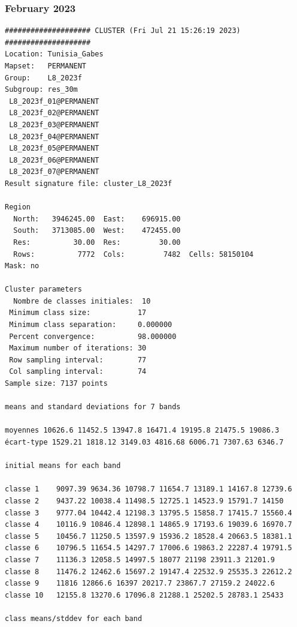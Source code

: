 \documentclass[land,article,submit,pdftex,moreauthors]{Definitions/mdpi}
\begin{document}
\subsubsection[\appendixname~\thesubsubsection]{February 2023}
\begin{scriptsize}
\begin{verbatim}
#################### CLUSTER (Fri Jul 21 15:26:19 2023) ####################
Location: Tunisia_Gabes
Mapset:   PERMANENT
Group:    L8_2023f
Subgroup: res_30m
 L8_2023f_01@PERMANENT
 L8_2023f_02@PERMANENT
 L8_2023f_03@PERMANENT
 L8_2023f_04@PERMANENT
 L8_2023f_05@PERMANENT
 L8_2023f_06@PERMANENT
 L8_2023f_07@PERMANENT
Result signature file: cluster_L8_2023f

Region
  North:   3946245.00  East:    696915.00
  South:   3713085.00  West:    472455.00
  Res:          30.00  Res:         30.00
  Rows:          7772  Cols:         7482  Cells: 58150104
Mask: no

Cluster parameters
  Nombre de classes initiales: 	10
 Minimum class size:           17
 Minimum class separation:     0.000000
 Percent convergence:          98.000000
 Maximum number of iterations: 30
 Row sampling interval:        77
 Col sampling interval:        74
Sample size: 7137 points

means and standard deviations for 7 bands

moyennes 10626.6 11452.5 13947.8 16471.4 19195.8 21475.5 19086.3
écart-type 1529.21 1818.12 3149.03 4816.68 6006.71 7307.63 6346.7

initial means for each band

classe 1    9097.39 9634.36 10798.7 11654.7 13189.1 14167.8 12739.6
classe 2    9437.22 10038.4 11498.5 12725.1 14523.9 15791.7 14150
classe 3    9777.04 10442.4 12198.3 13795.5 15858.7 17415.7 15560.4
classe 4    10116.9 10846.4 12898.1 14865.9 17193.6 19039.6 16970.7
classe 5    10456.7 11250.5 13597.9 15936.2 18528.4 20663.5 18381.1
classe 6    10796.5 11654.5 14297.7 17006.6 19863.2 22287.4 19791.5
classe 7    11136.3 12058.5 14997.5 18077 21198 23911.3 21201.9
classe 8    11476.2 12462.6 15697.2 19147.4 22532.9 25535.3 22612.2
classe 9    11816 12866.6 16397 20217.7 23867.7 27159.2 24022.6
classe 10   12155.8 13270.6 17096.8 21288.1 25202.5 28783.1 25433

class means/stddev for each band


\end{verbatim}
\end{scriptsize}
\end{document}
